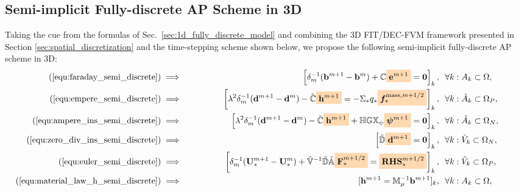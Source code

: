 \documentclass{article}
\newcommand{\mycolorbox}[2]{\colorbox{#1}{$\displaystyle#2$}}
\begin{document}
\subsection{Semi-implicit Fully-discrete AP Scheme in 3D} \label{sec:3d_ap_scheme}

Taking the cue from the formulas of Sec.~\ref{sec:1d_fully_discrete_model} and combining the
3D FIT/DEC-FVM framework presented in Section \ref{sec:spatial_discretization} and the
time-stepping scheme shown below, we propose the following semi-implicit fully-discrete AP
scheme in 3D:
\begin{subequations}
\begin{align}
    (\ref{equ:faraday_semi_discrete}) &\implies \;\;\;\;\;\;\;\;\;\;\;\;\;\; &
    \left[\delta_m^{-1} (\mathbf{b}^{m+1} - \mathbf{b}^{m}) + \mathbb{C}\mycolorbox{orange!30}{\mathbf{e}^{m+1}} = \mathbf{0} \right]_k,\ \ &\forall k:A_k \subset \Omega, \;\;\;\;\;\;\;\;\;\;\;\label{equ:maxwell_faraday_ap}\\
    (\ref{equ:empere_semi_discrete}) &\implies &
    \left[\lambda^2\delta_m^{-1}(\mathbf{d}^{m+1} - \mathbf{d}^m)- \Tilde{\mathbb{C}}\mycolorbox{orange!30}{\mathbf{h}^{m+1}} = - \Sigma_\ast q_\ast \mycolorbox{orange!30}{\bm{f}^{\text{mass},m+1/2}_{\ast}}\right]_k,\ \ &\forall k:\Tilde{A}_k\subset\Omega_P, \label{equ:maxwell_ampere_plasma_ap}\\
    (\ref{equ:ampere_ins_semi_discrete}) &\implies &
    \left[\lambda^2\delta_m^{-1}(\mathbf{d}^{m+1} - \mathbf{d}^m)- \Tilde{\mathbb{C}}\mycolorbox{orange!30}{\mathbf{h}^{m+1}} + \mathbb{H}\mathbb{GX}_\psi\mycolorbox{orange!30}{\bm{\psi}^{m+1}} = \mathbf{0} \right]_k,\ \ &\forall k:\Tilde{A}_k\subset\Omega_N, \label{equ:maxwell_ampere_nonconducting_ap}\\
    (\ref{equ:zero_div_ins_semi_discrete}) &\implies &
    \left[\Tilde{\mathbb{D}}\mycolorbox{orange!30}{\mathbf{d}^{m+1}} = \mathbf{0}\right]_k, \ \ &\forall k : \Tilde{V}_k \subset \Omega_N, \label{equ:gauss_nonconducting_ap} \\
    (\ref{equ:euler_semi_discrete}) &\implies &
    \left[\delta_m^{-1}(\mathbf{U}_{*}^{m+1} - \mathbf{U}_{*}^{m}) + \mathbb{\Tilde{V}}^{-1}\mathbb{\Tilde{D}}\mathbb{\Tilde{A}}\mycolorbox{orange!30}{\mathbf{F}_\ast^{m+1/2}} = \mycolorbox{orange!30}{\mathbf{RHS}_\ast^{m+1/2}} \right]_k,\ \ &\forall k : \Tilde{V}_k \subset \Omega_P, \label{equ:euler_ap}\\
    (\ref{equ:material_law_h_semi_discrete}) &\implies &
    [\mathbf{h}^{m+1} = \mathbb{M}_\mu^{-1}\mathbf{b}^{m+1}]_k, \ \ &\forall k:A_k \subset \Omega, \label{equ:material_law_h_ap}\\

\end{align}
\end{subequations}
\end{document}
